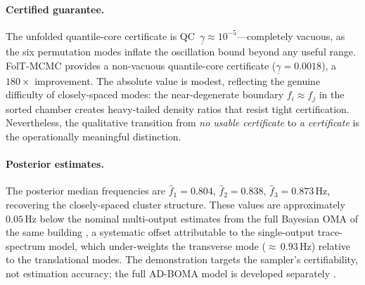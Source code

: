 \paragraph{Certified guarantee.}
The unfolded quantile-core certificate is
QC~$\underline{\gamma} \approx 10^{-5}$---completely vacuous, as
the six permutation modes inflate the oscillation bound beyond
any useful range.  FolT-MCMC provides a non-vacuous quantile-core certificate
($\underline{\gamma} = 0.0018$), a $180\times$
improvement.  The absolute value is modest, reflecting the genuine
difficulty of closely-spaced modes: the near-degenerate boundary
$f_i \approx f_j$ in the sorted chamber creates heavy-tailed
density ratios that resist tight certification.  Nevertheless, the
qualitative transition from \emph{no usable certificate} to
\emph{a certificate} is the operationally meaningful distinction.

\paragraph{Posterior estimates.}
The posterior median frequencies are
$\hat{f}_1 = 0.804$, $\hat{f}_2 = 0.838$, $\hat{f}_3 = 0.873$\,Hz,
recovering the closely-spaced cluster structure.  These values are
approximately $0.05$\,Hz below the nominal multi-output estimates
from the full Bayesian OMA of the same building
\citep{Hu2019}, a systematic offset attributable to the
single-output trace-spectrum model, which under-weights the
transverse mode (${\approx}\,0.93$\,Hz) relative to the
translational modes.  The demonstration targets the sampler's
certifiability, not estimation accuracy;
the full AD-BOMA model is developed separately
\citep{SATMCMCpaper}.
